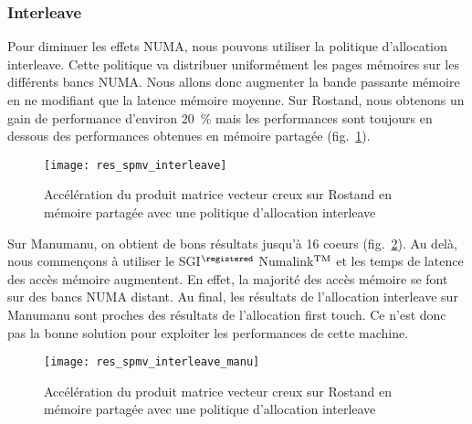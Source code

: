 \subsubsection{Interleave}
Pour diminuer les effets NUMA, nous pouvons utiliser la politique d'allocation interleave.
%
Cette politique va distribuer uniformément les pages mémoires sur les différents bancs NUMA.
%
Nous allons donc augmenter la bande passante mémoire en ne modifiant que la latence mémoire moyenne.
%
Sur Rostand, nous obtenons un gain de performance d'environ 20~\% mais les performances sont toujours en dessous des performances obtenues en mémoire partagée (fig.~\ref{fig:res_spmv_interleave_rostand}).

\begin{figure}[t!]
  \centering
  \texttt{[image: res\_spmv\_interleave]}
  \caption{Accélération du produit matrice vecteur creux sur Rostand en mémoire partagée avec une politique d'allocation interleave}
  \label{fig:res_spmv_interleave_rostand}
\end{figure}

Sur Manumanu, on obtient de bons résultats jusqu'à 16 coeurs (fig.~\ref{fig:res_spmv_interleave_manumanu}).
%
Au delà, nous commençons à utiliser le SGI$^\registered$ Numalink$^{\rm TM}$ et les temps de latence des accès mémoire augmentent.
%
En effet, la majorité des accès mémoire se font sur des bancs NUMA distant.
%
Au final, les résultats de l'allocation interleave sur Manumanu sont proches des résultats de l'allocation first touch.
%
Ce n'est donc pas la bonne solution pour exploiter les performances de cette machine.

\begin{figure}[t!]
  \centering
  \texttt{[image: res\_spmv\_interleave\_manu]}
  \caption{Accélération du produit matrice vecteur creux sur Rostand en mémoire partagée avec une politique d'allocation interleave}
  \label{fig:res_spmv_interleave_manumanu}
\end{figure}
